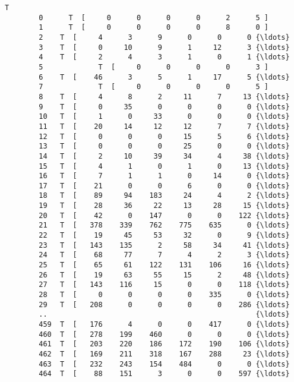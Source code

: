 \documentclass[11pt]{article}
\begin{document}
\begin{Verbatim}[commandchars=\\\{\}]
                                                             T  
        0      T  [     0      0      0      0      2      5 ]  
        1      T  [     0      0      0      0      8      0 ]  
        2    T  [     4      3      9      0      0      0 {\ldots}  
        3    T  [     0     10      9      1     12      3 {\ldots}  
        4    T  [     2      4      3      1      0      1 {\ldots}  
        5             T  [     0      0      0      0      3 ]  
        6    T  [    46      3      5      1     17      5 {\ldots}  
        7             T  [     0      0      0      0      5 ]  
        8    T  [     4      8      2     11      7     13 {\ldots}  
        9    T  [     0     35      0      0      0      0 {\ldots}  
        10   T  [     1      0     33      0      0      0 {\ldots}  
        11   T  [    20     14     12     12      7      7 {\ldots}  
        12   T  [     0      0      0     15      5      6 {\ldots}  
        13   T  [     0      0      0     25      0      0 {\ldots}  
        14   T  [     2     10     39     34      4     38 {\ldots}  
        15   T  [     4      1      0      1      0     13 {\ldots}  
        16   T  [     7      1      1      0     14      0 {\ldots}  
        17   T  [    21      0      0      6      0      0 {\ldots}  
        18   T  [    89     94    183     24      4      2 {\ldots}  
        19   T  [    28     36     22     13     28     15 {\ldots}  
        20   T  [    42      0    147      0      0    122 {\ldots}  
        21   T  [   378    339    762    775    635      0 {\ldots}  
        22   T  [    19     45     53     32      0      9 {\ldots}  
        23   T  [   143    135      2     58     34     41 {\ldots}  
        24   T  [    68     77      7      4      2      3 {\ldots}  
        25   T  [    65     61    122    131    106     16 {\ldots}  
        26   T  [    19     63     55     15      2     48 {\ldots}  
        27   T  [   143    116     15      0      0    118 {\ldots}  
        28   T  [     0      0      0      0    335      0 {\ldots}  
        29   T  [   208      0      0      0      0    286 {\ldots}  
        ..                                                 {\ldots}  
        459  T  [   176      4      0      0    417      0 {\ldots}  
        460  T  [   278    199    460      0      0      0 {\ldots}  
        461  T  [   203    220    186    172    190    106 {\ldots}  
        462  T  [   169    211    318    167    288     23 {\ldots}  
        463  T  [   232    243    154    484      0      0 {\ldots}  
        464  T  [    88    151      3      0      0    597 {\ldots}  

\end{Verbatim}
\end{document}
